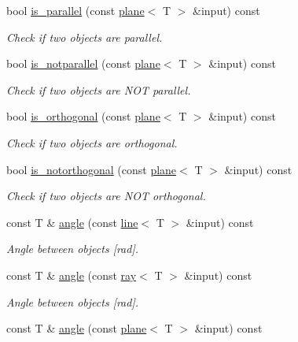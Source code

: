 \begin{DoxyCompactItemize}
bool \hyperlink{classddd_1_1plane_af94adfd507e373307fea80b6c4061d80}{is\+\_\+parallel} (const \hyperlink{classddd_1_1plane}{plane}$<$ T $>$ \&input) const
\begin{DoxyCompactList}\small\item\em Check if two objects are parallel. \end{DoxyCompactList}\item 
bool \hyperlink{classddd_1_1plane_a43d2c86ea24af8c084623632326f18a0}{is\+\_\+notparallel} (const \hyperlink{classddd_1_1plane}{plane}$<$ T $>$ \&input) const
\begin{DoxyCompactList}\small\item\em Check if two objects are N\+OT parallel. \end{DoxyCompactList}\item 
bool \hyperlink{classddd_1_1plane_a385d3ae184ada014ea95e8139a0995d0}{is\+\_\+orthogonal} (const \hyperlink{classddd_1_1plane}{plane}$<$ T $>$ \&input) const
\begin{DoxyCompactList}\small\item\em Check if two objects are orthogonal. \end{DoxyCompactList}\item 
bool \hyperlink{classddd_1_1plane_a81746ebaea1459d7b79b462c892b0937}{is\+\_\+notorthogonal} (const \hyperlink{classddd_1_1plane}{plane}$<$ T $>$ \&input) const
\begin{DoxyCompactList}\small\item\em Check if two objects are N\+OT orthogonal. \end{DoxyCompactList}\item 
const T \& \hyperlink{classddd_1_1plane_a5107cac34cbae7ff286f0b0e9a90c940}{angle} (const \hyperlink{classddd_1_1line}{line}$<$ T $>$ \&input) const
\begin{DoxyCompactList}\small\item\em Angle between objects \mbox{[}rad\mbox{]}. \end{DoxyCompactList}\item 
const T \& \hyperlink{classddd_1_1plane_a4e472e461308a96438c26b73b9338593}{angle} (const \hyperlink{classddd_1_1ray}{ray}$<$ T $>$ \&input) const
\begin{DoxyCompactList}\small\item\em Angle between objects \mbox{[}rad\mbox{]}. \end{DoxyCompactList}\item 
const T \& \hyperlink{classddd_1_1plane_ae6f58f5c23ff49aa351f22ccccee46b6}{angle} (const \hyperlink{classddd_1_1plane}{plane}$<$ T $>$ \&input) const

\end{DoxyCompactItemize}
